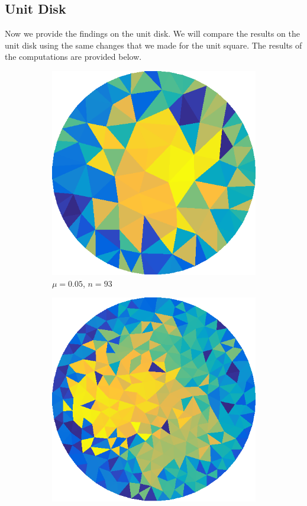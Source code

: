 \documentclass[../fem.tex]{subfile}
\begin{document}
\subsection{Unit Disk}%
\label{sub:unit_disk}

Now we provide the findings on the unit disk. We will compare the results on
the unit disk using the same changes that we made for the unit square. The
results of the computations are provided below.

\begin{figure}[htpb]
  \centering
  \begin{subfigure}{0.4\textwidth}
    \centering
    \includegraphics[width=0.8\linewidth]{figures/c1a/tri.png}
    \caption{$\mu=0.05$, $n=93$}
  \end{subfigure}
  \begin{subfigure}{0.4\textwidth}
    \centering
    \includegraphics[width=0.8\linewidth]{figures/c1b/tri.png}

\end{subfigure}
\end{figure}
\end{document}
